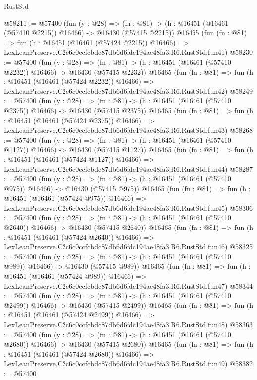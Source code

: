 \begin{lexlean}{RustStd}
\begin{coremodule}
@58211 := @57400
    (fun (y : @28) =>
    (fn : @81) -> (h : @16451 (@16461 (@57410 @2215)) @16466) -> @16430 (@57415 @2215))
    @16465
    (fun (fn : @81) =>
    fun (h : @16451 (@16461 (@57424 @2215)) @16466) =>
    LexLeanPreserve.C2c6c0ccfcbdc87db6d6fdc194ae48fa3.R6.RustStd.fun41)
@58230 := @57400
    (fun (y : @28) =>
    (fn : @81) -> (h : @16451 (@16461 (@57410 @2232)) @16466) -> @16430 (@57415 @2232))
    @16465
    (fun (fn : @81) =>
    fun (h : @16451 (@16461 (@57424 @2232)) @16466) =>
    LexLeanPreserve.C2c6c0ccfcbdc87db6d6fdc194ae48fa3.R6.RustStd.fun42)
@58249 := @57400
    (fun (y : @28) =>
    (fn : @81) -> (h : @16451 (@16461 (@57410 @2375)) @16466) -> @16430 (@57415 @2375))
    @16465
    (fun (fn : @81) =>
    fun (h : @16451 (@16461 (@57424 @2375)) @16466) =>
    LexLeanPreserve.C2c6c0ccfcbdc87db6d6fdc194ae48fa3.R6.RustStd.fun43)
@58268 := @57400
    (fun (y : @28) =>
    (fn : @81) -> (h : @16451 (@16461 (@57410 @1127)) @16466) -> @16430 (@57415 @1127))
    @16465
    (fun (fn : @81) =>
    fun (h : @16451 (@16461 (@57424 @1127)) @16466) =>
    LexLeanPreserve.C2c6c0ccfcbdc87db6d6fdc194ae48fa3.R6.RustStd.fun44)
@58287 := @57400
    (fun (y : @28) =>
    (fn : @81) -> (h : @16451 (@16461 (@57410 @975)) @16466) -> @16430 (@57415 @975))
    @16465
    (fun (fn : @81) =>
    fun (h : @16451 (@16461 (@57424 @975)) @16466) =>
    LexLeanPreserve.C2c6c0ccfcbdc87db6d6fdc194ae48fa3.R6.RustStd.fun45)
@58306 := @57400
    (fun (y : @28) =>
    (fn : @81) -> (h : @16451 (@16461 (@57410 @2640)) @16466) -> @16430 (@57415 @2640))
    @16465
    (fun (fn : @81) =>
    fun (h : @16451 (@16461 (@57424 @2640)) @16466) =>
    LexLeanPreserve.C2c6c0ccfcbdc87db6d6fdc194ae48fa3.R6.RustStd.fun46)
@58325 := @57400
    (fun (y : @28) =>
    (fn : @81) -> (h : @16451 (@16461 (@57410 @989)) @16466) -> @16430 (@57415 @989))
    @16465
    (fun (fn : @81) =>
    fun (h : @16451 (@16461 (@57424 @989)) @16466) =>
    LexLeanPreserve.C2c6c0ccfcbdc87db6d6fdc194ae48fa3.R6.RustStd.fun47)
@58344 := @57400
    (fun (y : @28) =>
    (fn : @81) -> (h : @16451 (@16461 (@57410 @2499)) @16466) -> @16430 (@57415 @2499))
    @16465
    (fun (fn : @81) =>
    fun (h : @16451 (@16461 (@57424 @2499)) @16466) =>
    LexLeanPreserve.C2c6c0ccfcbdc87db6d6fdc194ae48fa3.R6.RustStd.fun48)
@58363 := @57400
    (fun (y : @28) =>
    (fn : @81) -> (h : @16451 (@16461 (@57410 @2680)) @16466) -> @16430 (@57415 @2680))
    @16465
    (fun (fn : @81) =>
    fun (h : @16451 (@16461 (@57424 @2680)) @16466) =>
    LexLeanPreserve.C2c6c0ccfcbdc87db6d6fdc194ae48fa3.R6.RustStd.fun49)
@58382 := @57400

\end{coremodule}
\end{lexlean}
